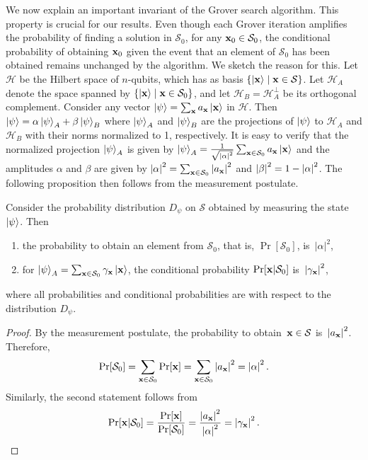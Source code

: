 \documentclass[a4paper,11pt]{article}
\begin{document}
We now explain an important invariant of the Grover search algorithm. This property is crucial for our results. Even though each Grover iteration amplifies the probability of finding a solution in $\mathcal{S}_0$, for any $\xvec_0 \in \mathcal{S}_0$, the conditional probability of obtaining $\xvec_0$ given the event that an element of $\mathcal{S}_0$ has been obtained remains unchanged by the algorithm. We sketch the reason for this. Let $\mathcal{H}$ be the Hilbert space of $n$-qubits, which has as basis $\{\ket{\xvec}\mid\xvec \in \mathcal{S}\}$. Let $\mathcal{H}_A$ denote the space spanned by $\{ \ket{\xvec}\mid\xvec\in \mathcal{S}_0 \}$, and let $\mathcal{H}_B = \mathcal{H}_A^\perp$ be its orthogonal complement. Consider any vector $\ket{\psi} = \sum_{\xvec} a_{\xvec} \ket{\xvec}$ in $\mathcal{H}$.  Then $\left\vert \psi \right\rangle = \alpha \left\vert \psi \right\rangle_A + \beta \left\vert \psi \right\rangle_B$ where $\left\vert \psi \right\rangle_A$ and $\left\vert \psi \right\rangle_B$ are the projections of $\left\vert \psi \right\rangle$ to $\mathcal{H}_A$ and $\mathcal{H}_B$ with their norms normalized to 1, respectively. It is easy to verify that the normalized projection $\left\vert \psi \right\rangle_A$ is given by $\ket{\psi}_A = \frac{1}{\sqrt{\abs{\alpha}^2}} \sum_{\xvec \in \mathcal{S}_0} a_{\xvec} \ket{\xvec}$ and the amplitudes $\alpha$ and $\beta$ are given by $\abs{\alpha}^2 = \sum_{\xvec \in \mathcal{S}_0} \abs{a_{\xvec}}^2$ and $\left\vert \beta \right\vert^2 = 1 - \left\vert \alpha \right\vert^2$. The following proposition then follows from the measurement postulate.

\begin{proposition}\label{prop-conditional-prob}
  Consider the probability distribution $D_\psi$ on $\mathcal{S}$ obtained by measuring the state $\left\vert \psi \right\rangle$. Then
  \begin{enumerate}
  \item the probability to obtain an element from $\mathcal{S}_0$,
    that is, $\Pr[\mathcal{S}_0]$, is~$\vert\alpha\vert^2$,
  \item for $\ket{\psi}_A = \sum_{\xvec \in \mathcal{S}_0}
    \gamma_{\xvec} \ket{\xvec}$, the conditional probability
    $\Pr[\xvec| \mathcal{S}_0]$ is~$\abs{\gamma_{\xvec}}^{2}$,
\end{enumerate} where all probabilities and conditional probabilities are with respect
  to the distribution $D_\psi$.
\end{proposition}

\begin{proof}
By the measurement postulate, the probability to obtain~$\xvec\in \mathcal{S}$ is~$\abs{a_{\xvec}}^2$. Therefore,  
\[
  \Pr[\mathcal{S}_0] = \sum_{\xvec \in \mathcal{S}_0} \Pr[\xvec] = \sum_{\xvec \in \mathcal{S}_0} \abs{a_{\xvec}}^2 = \abs{\alpha}^2.
\]
Similarly, the second statement follows from 
  \[
  \Pr[\xvec| \mathcal{S}_0] = \frac{\Pr[\xvec]}{\Pr[\mathcal{S}_0]} = \frac{\abs{a_{\xvec}}^2}{\abs{\alpha}^{2} } = \abs{\gamma_{\xvec}}^{2}.
  \]
\end{proof}
\end{document}
